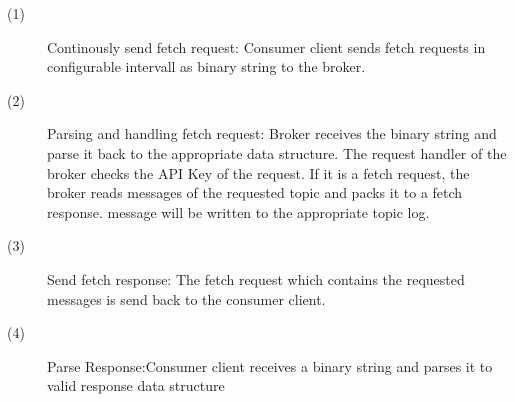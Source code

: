 \begin{description}
    \item [(1)] 
        {Continously send fetch request: Consumer client sends fetch
        requests in configurable intervall as binary string to the broker. } 
    \item [(2)] 
        {Parsing and handling fetch request: Broker receives the binary string
            and parse it back to the appropriate data structure. The request
            handler of the broker checks the API Key of the request. If it is a
            fetch request, the broker reads messages of the requested topic and
            packs it to a fetch response. message will be written to the
            appropriate topic log.}
    \item [(3)] 
        {Send fetch response: The fetch request which contains the requested
        messages is send back to the consumer client.}
    \item [(4)] 
        {Parse Response:Consumer client receives a binary string and parses it
        to valid response data structure }
\end{description}

